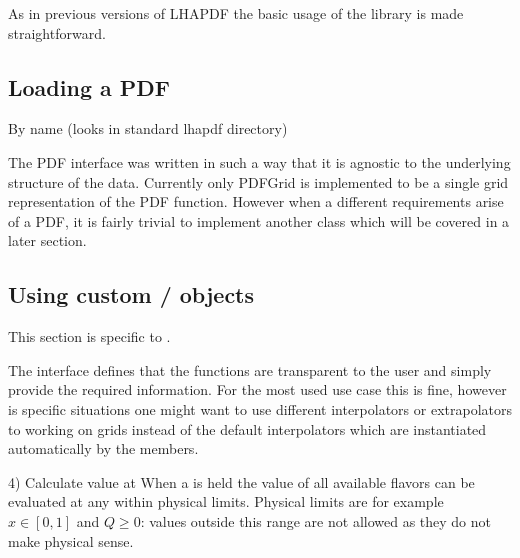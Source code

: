 As in previous versions of LHAPDF the basic usage of the library is made
straightforward.


\subsection{Loading a PDF}
By name (looks in standard lhapdf directory)



The PDF interface was written in such a way that it is agnostic to the
underlying structure of the data. Currently only PDFGrid is implemented to be a
single grid representation of the PDF function. However when a different
requirements arise of a PDF, it is fairly trivial to implement another class
which will be covered in a later section.



\subsection{Using custom / objects}
This section is specific to .

The  interface defines that the \xf functions are transparent to the
user and simply provide the required information. For the most used use case
this is fine, however is specific situations one might want to use different
interpolators or extrapolators to working on grids instead of the default
interpolators which are instantiated automatically by the members.


4) Calculate value at \xqsq When a  is held the value of all available
flavors can be evaluated at any \xqsq within physical limits. Physical limits
are for example $x \in [0,1]$ and $Q \ge 0$: values outside this range are not allowed as they
do not make physical sense.
